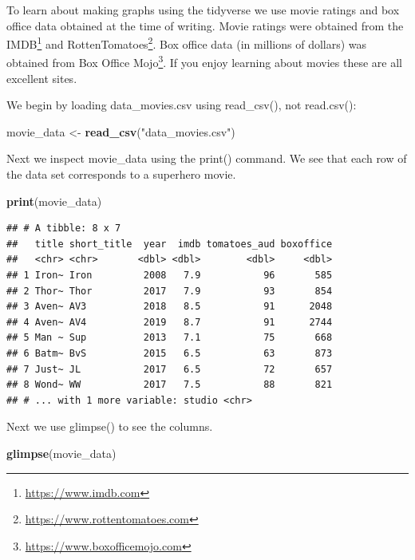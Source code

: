 \documentclass[
]{krantz}
\makeatletter
\newenvironment{Shaded}{\begin{snugshade}}{\end{snugshade}}
\newcommand{\KeywordTok}[1]{\textcolor[rgb]{0.27,0.27,0.27}{\textbf{#1}}}
\newcommand{\NormalTok}[1]{#1}
\newcommand{\StringTok}[1]{\textcolor[rgb]{0.5,0.5,0.5}{#1}}
\renewcommand{\href}[2]{#2\footnote{\url{#1}}}
\newenvironment{kframe}{%
\medskip{}
\setlength{\fboxsep}{.8em}
 \def\at@end@of@kframe{}%
 \ifinner\ifhmode%
  \def\at@end@of@kframe{\end{minipage}}%
  \begin{minipage}{\columnwidth}%
 \fi\fi%
 \def\FrameCommand##1{\hskip\@totalleftmargin \hskip-\fboxsep
 \colorbox{shadecolor}{##1}\hskip-\fboxsep
     \hskip-\linewidth \hskip-\@totalleftmargin \hskip\columnwidth}%
 \MakeFramed {\advance\hsize-\width
   \@totalleftmargin\z@ \linewidth\hsize
   \@setminipage}}%
 {\par\unskip\endMakeFramed%
 \at@end@of@kframe}
\renewenvironment{Shaded}{\begin{kframe}}{\end{kframe}}
\makeatother
\begin{document}
To learn about making graphs using the tidyverse we use movie ratings and box office data obtained at the time of writing. Movie ratings were obtained from the \href{https://www.imdb.com}{IMDB} and \href{https://www.rottentomatoes.com}{RottenTomatoes}. Box office data (in millions of dollars) was obtained from \href{https://www.boxofficemojo.com}{Box Office Mojo}. If you enjoy learning about movies these are all excellent sites.

We begin by loading data\_movies.csv using read\_csv(), not read.csv():

\begin{Shaded}
\begin{Highlighting}[]
\NormalTok{movie_data <-}\StringTok{ }\KeywordTok{read_csv}\NormalTok{(}\StringTok{"data_movies.csv"}\NormalTok{)}
\end{Highlighting}
\end{Shaded}

Next we inspect movie\_data using the print() command. We see that each row of the data set corresponds to a superhero movie.

\begin{Shaded}
\begin{Highlighting}[]
\KeywordTok{print}\NormalTok{(movie_data)}
\end{Highlighting}
\end{Shaded}

\begin{verbatim}
## # A tibble: 8 x 7
##   title short_title  year  imdb tomatoes_aud boxoffice
##   <chr> <chr>       <dbl> <dbl>        <dbl>     <dbl>
## 1 Iron~ Iron         2008   7.9           96       585
## 2 Thor~ Thor         2017   7.9           93       854
## 3 Aven~ AV3          2018   8.5           91      2048
## 4 Aven~ AV4          2019   8.7           91      2744
## 5 Man ~ Sup          2013   7.1           75       668
## 6 Batm~ BvS          2015   6.5           63       873
## 7 Just~ JL           2017   6.5           72       657
## 8 Wond~ WW           2017   7.5           88       821
## # ... with 1 more variable: studio <chr>
\end{verbatim}

Next we use glimpse() to see the columns.

\begin{Shaded}
\begin{Highlighting}[]
\KeywordTok{glimpse}\NormalTok{(movie_data)}
\end{Highlighting}
\end{Shaded}
\end{document}
